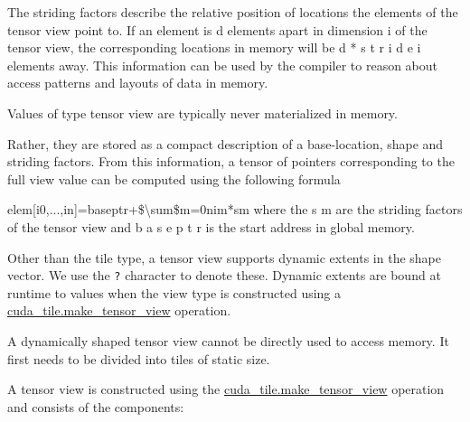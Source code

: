 \documentclass{article}
\begin{document}
The striding factors describe the relative position of locations the elements of the tensor view point to. If an element is d elements apart in dimension i of the tensor view, the corresponding locations in memory will be d * s t r i d e i elements away. This information can be used by the compiler to reason about access patterns and layouts of data in memory.


Values of type tensor view are typically never materialized in memory.

Rather, they are stored as a compact description of a base-location, shape and striding factors. From this information, a tensor of pointers corresponding to the full view value can be computed using the following formula


elem[i0,...,in]=baseptr+\$\textbackslash{}sum\$m=0nim*sm where the s m are the striding factors of the tensor view and b a s e p t r is the start address in global memory.


Other than the tile type, a tensor view supports dynamic extents in the shape vector. We use the \texttt{?} character to denote these. Dynamic extents are bound at runtime to values when the view type is constructed using a \href{https://docs.nvidia.com/cuda/tile-ir/latest/sections/operations.html#op-cuda-tile-make-tensor-view}{cuda\_tile.make\_tensor\_view} operation.


A dynamically shaped tensor view cannot be directly used to access memory. It first needs to be divided into tiles of static size.


A tensor view is constructed using the \href{https://docs.nvidia.com/cuda/tile-ir/latest/sections/operations.html#op-cuda-tile-make-tensor-view}{cuda\_tile.make\_tensor\_view} operation and consists of the components:
\end{document}
